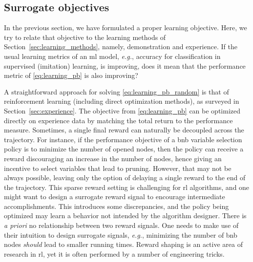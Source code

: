 \documentclass[11pt]{article}
\begin{document}
	\subsection{Surrogate objectives}
		\label{sec:learning_proxies}
		In the previous section, we have formulated a proper learning objective.
		Here, we try to relate that objective to the learning methods of
		Section~\ref{sec:learning_methods}, namely, demonstration and experience.
		If the usual learning metrics of an \gls{ml} model, \textit{e.g.}, accuracy for classification in
		supervised (imitation) learning, is improving, does it mean that the performance metric of
		\eqref{eq:learning_pb} is also improving?

		A straightforward approach for solving \eqref{eq:learning_pb_random} is that of reinforcement
		learning (including direct optimization methods), as surveyed in Section~\ref{sec:experience}.
		The objective from \eqref{eq:learning_pb} can be optimized directly on experience data by
		matching the total return to the performance measure.
		Sometimes, a single final reward can naturally be decoupled across the trajectory.
		For instance, if the performance objective of a \gls{bnb} variable selection policy is to minimize
		the number of opened nodes, then the policy can receive a reward discouraging an increase in the
		number of nodes, hence  giving an incentive to select variables that lead to pruning.
		However, that may not be always possible, leaving only the option of delaying a single reward to
	    the end of the trajectory.
		This sparse reward setting is challenging for \gls{rl} algorithms, and one might want to design a
		surrogate reward signal to encourage intermediate accomplishments.
		This introduces some discrepancies, and the policy being optimized may learn a behavior not
		intended by the algorithm designer.
		There is \textit{a priori} no relationship between two reward signals.
		One needs to make use of their intuition to design surrogate signals, \textit{e.g.}, minimizing the
		number of \gls{bnb} nodes \textit{should} lead to smaller running times.
		Reward shaping is an active area of research in \gls{rl}, yet it is often performed by a number of
		engineering tricks.
\end{document}
